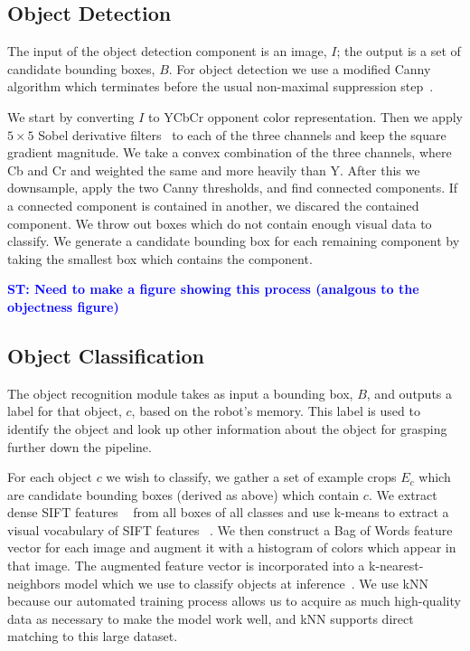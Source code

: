\documentclass{article}
\newcommand{\stnote}[1]{\textcolor{blue}{\textbf{ST: #1}}}
\begin{document}
\subsection{Object Detection}
\label{sec:detection}

The input of the object detection component is an image, $I$; the
output is a set of candidate bounding boxes, $B$.  For object
detection we use a modified Canny algorithm which terminates before
the usual non-maximal suppression step~\citep{canny86}.


We start by converting $I$ to YCbCr opponent color representation.
Then we apply $5 \times 5$ Sobel derivative filters~\citep{sobel95} to
each of the three channels and keep the square gradient magnitude. We
take a convex combination of the three channels, where Cb and Cr and
weighted the same and more heavily than Y.  After this we downsample,
apply the two Canny thresholds, and find connected components.  If a
connected component is contained in another, we discared the contained
component.  We throw out boxes which do not contain enough visual data
to classify.  We generate a candidate bounding box for each remaining
component by taking the smallest box which contains the component.

\stnote{Need to make a figure showing this process (analgous to the
  objectness figure)}

\subsection{Object Classification}
\label{sec:recognition}

The object recognition module takes as input a bounding box, $B$, and
outputs a label for that object, $c$, based on the robot's memory.
This label is used to identify the object and look up other
information about the object for grasping further down the pipeline.

For each object $c$ we wish to classify, we gather a set of example
crops $E_c$ which are candidate bounding boxes (derived as above)
which contain $c$. We extract dense SIFT features ~\citep{lowe99} from
all boxes of all classes and use k-means to extract a visual
vocabulary of SIFT features ~\citep{szeliski10}. We then construct a
Bag of Words feature vector for each image and augment it with a histogram of
colors which appear in that image.  The augmented feature vector is
incorporated into a k-nearest-neighbors model which we use to classify
objects at inference~\citep{szeliski10}. We use kNN because our
automated training process allows us to acquire as much high-quality
data as necessary to make the model work well, and kNN supports direct
matching to this large dataset.  
\end{document}

